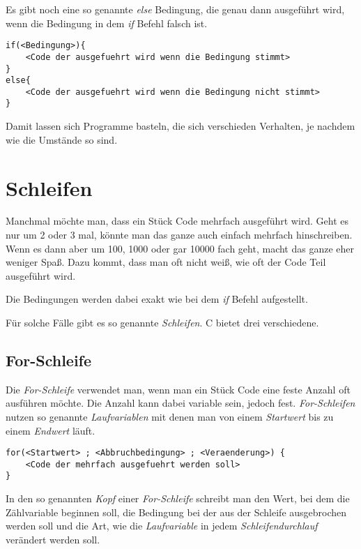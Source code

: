\documentclass[c_worksheet.tex]{subfiles}
\begin{document}
Es gibt noch eine so genannte \emph{else} Bedingung, die genau dann ausgeführt wird, wenn die Bedingung in dem \emph{if} Befehl falsch ist.

\begin{lstlisting}[numbers=none]
if(<Bedingung>){
	<Code der ausgefuehrt wird wenn die Bedingung stimmt>
}
else{
	<Code der ausgefuehrt wird wenn die Bedingung nicht stimmt>
}
\end{lstlisting}

Damit lassen sich Programme basteln, die sich verschieden Verhalten, je nachdem wie die Umstände so sind.





\section{Schleifen} 

Manchmal möchte man, dass ein Stück Code mehrfach ausgeführt wird. Geht es nur um 2 oder 3 mal, könnte man das ganze auch einfach mehrfach hinschreiben. Wenn es dann aber um 100, 1000 oder gar 10000 fach geht, macht das ganze eher weniger Spaß. Dazu kommt, dass man oft nicht weiß, wie oft der Code Teil ausgeführt wird.

Die Bedingungen werden dabei exakt wie bei dem \emph{if} Befehl aufgestellt.

Für solche Fälle gibt es so genannte \emph{Schleifen}. C bietet drei verschiedene.

\subsection{For-Schleife}

Die \emph{For-Schleife} verwendet man, wenn man ein Stück Code eine feste Anzahl oft ausführen möchte. Die Anzahl kann dabei variable sein, jedoch fest. \emph{For-Schleifen} nutzen so genannte \emph{Laufvariablen} mit denen man von einem \emph{Startwert} bis zu einem \emph{Endwert} läuft.

\begin{lstlisting}[numbers=none]
for(<Startwert> ; <Abbruchbedingung> ; <Veraenderung>) {
	<Code der mehrfach ausgefuehrt werden soll>
}
\end{lstlisting}

In den so genannten \emph{Kopf} einer \emph{For-Schleife} schreibt man den Wert, bei dem die Zählvariable beginnen soll, die Bedingung bei der aus der Schleife ausgebrochen werden soll und die Art, wie die \emph{Laufvariable} in jedem \emph{Schleifendurchlauf} verändert werden soll.
\end{document}
